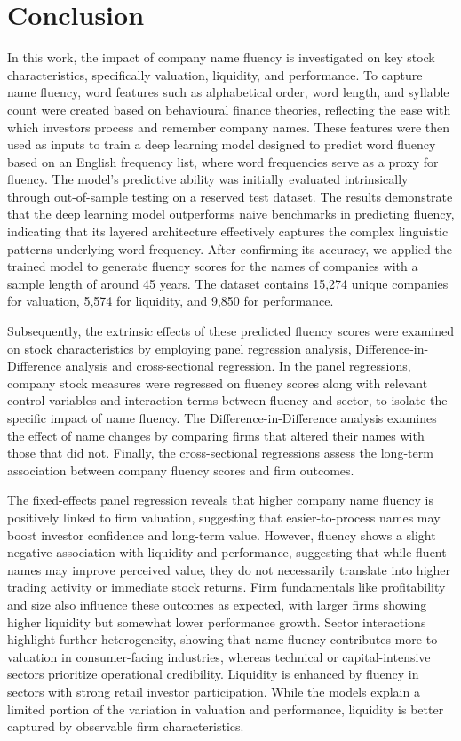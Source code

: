 \documentclass[a4paper,11pt]{report}
\begin{document}
\chapter{Conclusion} \label{sec:conclusion}
In this work, the impact of company name fluency is investigated on key stock characteristics, specifically valuation, liquidity, and performance. To capture name fluency, word features such as alphabetical order, word length, and syllable count were created based on behavioural finance theories, reflecting the ease with which investors process and remember company names. These features were then used as inputs to train a deep learning model designed to predict word fluency based on an English frequency list, where word frequencies serve as a proxy for fluency. The model’s predictive ability was initially evaluated intrinsically through out-of-sample testing on a reserved test dataset. The results demonstrate that the deep learning model outperforms naive benchmarks in predicting fluency, indicating that its layered architecture effectively captures the complex linguistic patterns underlying word frequency. After confirming its accuracy, we applied the trained model to generate fluency scores for the names of companies with a sample length of around 45 years. The dataset contains 15,274 unique companies for valuation, 5,574 for liquidity, and 9,850 for performance. 

Subsequently, the extrinsic effects of these predicted fluency scores were examined on stock characteristics by employing panel regression analysis, Difference-in-Difference analysis and cross-sectional regression. In the panel regressions, company stock measures were regressed on fluency scores along with relevant control variables and interaction terms between fluency and sector, to isolate the specific impact of name fluency. The Difference-in-Difference analysis examines the effect of name changes by comparing firms that altered their names with those that did not. Finally, the cross-sectional regressions assess the long-term association between company fluency scores and firm outcomes.

The fixed-effects panel regression reveals that higher company name fluency is positively linked to firm valuation, suggesting that easier-to-process names may boost investor confidence and long-term value. However, fluency shows a slight negative association with liquidity and performance, suggesting that while fluent names may improve perceived value, they do not necessarily translate into higher trading activity or immediate stock returns. Firm fundamentals like profitability and size also influence these outcomes as expected, with larger firms showing higher liquidity but somewhat lower performance growth. Sector interactions highlight further heterogeneity, showing that name fluency contributes more to valuation in consumer-facing industries, whereas technical or capital-intensive sectors prioritize operational credibility. Liquidity is enhanced by fluency in sectors with strong retail investor participation. While the models explain a limited portion of the variation in valuation and performance, liquidity is better captured by observable firm characteristics. 
\end{document}
